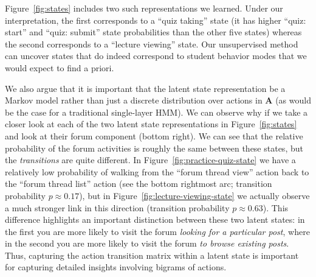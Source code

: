 Figure~\ref{fig:states} includes two such representations we learned. Under
our interpretation, the first corresponds to a ``quiz taking'' state (it
has higher ``quiz: start'' and ``quiz: submit'' state probabilities than
the other five states) whereas the second corresponds to a ``lecture
viewing'' state. Our unsupervised method can uncover states that do indeed
correspond to student behavior modes that we would expect to find a priori.

We also argue that it is important that the latent state representation be
a Markov model rather than just a discrete distribution over actions in
$\mathbf{A}$ (as would be the case for a traditional single-layer HMM). We
can observe why if we take a closer look at each of the two latent state
representations in Figure~\ref{fig:states} and look at their forum
component (bottom right). We can see that the relative probability of the
forum activities is roughly the same between these states, but the
\emph{transitions} are quite different. In
Figure~\ref{fig:practice-quiz-state} we have a relatively low probability
of walking from the ``forum thread view'' action back to the ``forum thread
list'' action (see the bottom rightmost arc; transition probability $p
\approx 0.17$), but in Figure~\ref{fig:lecture-viewing-state} we actually
observe a much stronger link in this direction (transition probability $p
\approx 0.63$). This difference highlights an important distinction between
these two latent states: in the first you are more likely to visit the
forum \emph{looking for a particular post}, where in the second you are
more likely to visit the forum \emph{to browse existing posts}. Thus,
capturing the action transition matrix within a latent state is important
for capturing detailed insights involving bigrams of actions.

